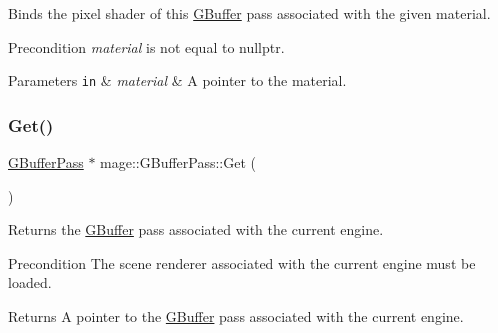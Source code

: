 Binds the pixel shader of this \hyperlink{structmage_1_1_g_buffer}{G\+Buffer} pass associated with the given material.

\begin{DoxyPrecond}{Precondition}
{\itshape material} is not equal to {\ttfamily nullptr}. 
\end{DoxyPrecond}

\begin{DoxyParams}[1]{Parameters}
\mbox{\tt in}  & {\em material} & A pointer to the material. \\
\hline
\end{DoxyParams}
\hypertarget{classmage_1_1_g_buffer_pass_ab2a50a7bde900978153badaa49cf047c}{}\label{classmage_1_1_g_buffer_pass_ab2a50a7bde900978153badaa49cf047c} 
\subsubsection{\texorpdfstring{Get()}{Get()}}
{\footnotesize\ttfamily \hyperlink{classmage_1_1_g_buffer_pass}{G\+Buffer\+Pass} $\ast$ mage\+::\+G\+Buffer\+Pass\+::\+Get (\begin{DoxyParamCaption}{ }\end{DoxyParamCaption})\hspace{0.3cm}{\ttfamily [static]}}

Returns the \hyperlink{structmage_1_1_g_buffer}{G\+Buffer} pass associated with the current engine.

\begin{DoxyPrecond}{Precondition}
The scene renderer associated with the current engine must be loaded. 
\end{DoxyPrecond}
\begin{DoxyReturn}{Returns}
A pointer to the \hyperlink{structmage_1_1_g_buffer}{G\+Buffer} pass associated with the current engine. 
\end{DoxyReturn}
\hypertarget{classmage_1_1_g_buffer_pass_a5810afcec108273c1ad893b129ffc46c}{}\label{classmage_1_1_g_buffer_pass_a5810afcec108273c1ad893b129ffc46c} 
